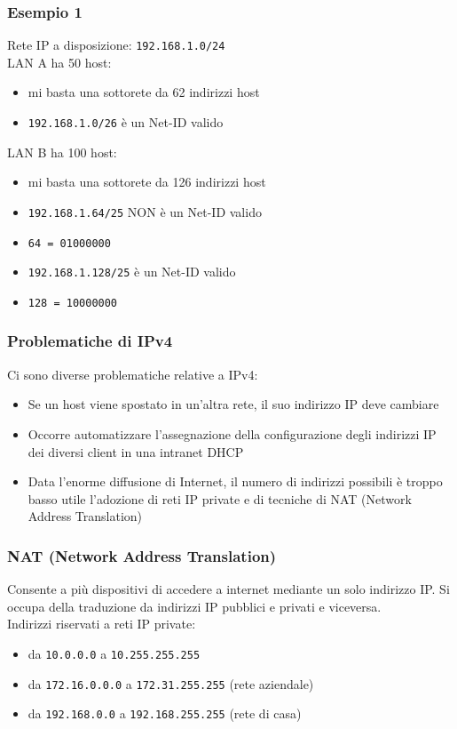 \documentclass[aspectratio=169]{beamer}
\begin{document}
    \begin{frame}
        \frametitle{Esempio 1}
        Rete IP a disposizione: \texttt{192.168.1.0/24}\\
        LAN A ha 50 host:
        \begin{itemize}
            \item mi basta una sottorete da 62 indirizzi host
            \item \texttt{192.168.1.0/26} è un Net-ID valido
        \end{itemize}
        LAN B ha 100 host:
        \begin{itemize}
            \item mi basta una sottorete da 126 indirizzi host
            \item \texttt{192.168.1.64/25} NON è un Net-ID valido
            \item \texttt{64 = 01000000}
            \item \texttt{192.168.1.128/25} è un Net-ID valido
            \item \texttt{128 = 10000000}
        \end{itemize}
    \end{frame}
    
    \begin{frame}
        \frametitle{Problematiche di IPv4}
        Ci sono diverse problematiche relative a IPv4:
        \begin{itemize}
            \item Se un host viene spostato in un'altra rete, il suo indirizzo IP deve cambiare
            \item Occorre automatizzare l'assegnazione della configurazione degli indirizzi IP dei diversi client in una intranet \MVRightarrow{} DHCP
            \item Data l'enorme diffusione di Internet, il numero di indirizzi possibili è troppo basso \MVRightarrow{} utile l'adozione di reti IP private e di tecniche di NAT (Network Address Translation)
        \end{itemize}
    \end{frame}
    
    \begin{frame}
        \frametitle{NAT (Network Address Translation)}
        Consente a più dispositivi di accedere a internet mediante un solo indirizzo IP. Si occupa della traduzione da indirizzi IP pubblici e privati e viceversa.\\
        Indirizzi riservati a reti IP private:
        \begin{itemize}
            \item da \texttt{10.0.0.0} a \texttt{10.255.255.255}
            \item da \texttt{172.16.0.0.0} a \texttt{172.31.255.255} (rete aziendale)
            \item da \texttt{192.168.0.0} a \texttt{192.168.255.255} (rete di casa)
        \end{itemize}
    \end{frame}
    
\end{document}
